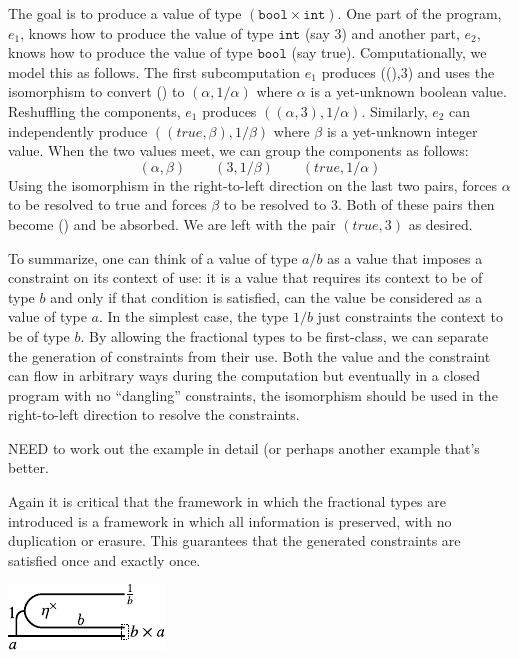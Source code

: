 \documentclass[preprint]{sigplanconf}
\begin{document}
{The goal is to produce a value of type $(\texttt{bool} \times
\texttt{int})$. One part of the program, $e_1$, knows how to produce the
value of type $\texttt{int}$ (say {{3}}) and another part, $e_2$, knows how
to produce the value of type $\texttt{bool}$ (say true). Computationally, we
model this as follows. The first subcomputation $e_1$ produces {{((),3)}} and
uses the isomorphism to convert {{()}} to $(\alpha,1/\alpha)$ where $\alpha$
is a yet-unknown boolean value. Reshuffling the components, $e_1$ produces
$((\alpha,3), 1/\alpha)$. Similarly, $e_2$ can independently produce
$((true,\beta),1/\beta)$ where $\beta$ is a yet-unknown integer value.  When
the two values meet, we can group the components as follows:
\[
(\alpha,\beta)  \qquad (3,1/\beta)  \qquad (true,1/\alpha)
\]
Using the isomorphism in the right-to-left direction on the last two pairs,
forces $\alpha$ to be resolved to true and forces $\beta$ to be resolved to
{{3}}. Both of these pairs then become {{()}} and be absorbed. We are left
with the pair $(true,3)$ as desired.

To summarize, one can think of a value of type $a/b$ as a value that imposes
a constraint on its context of use: it is a value that requires its context
to be of type $b$ and only if that condition is satisfied, can the value be
considered as a value of type $a$. In the simplest case, the type $1/b$ just
constraints the context to be of type $b$. By allowing the fractional types
to be first-class, we can separate the generation of constraints from their
use. Both the value and the constraint can flow in arbitrary ways during the
computation but eventually in a closed program with no ``dangling''
constraints, the isomorphism should be used in the right-to-left direction to
resolve the constraints.

NEED to work out the example in detail (or perhaps another example that's
better. 

Again it is critical that the framework in which the fractional types are
introduced is a framework in which all information is preserved, with no
duplication or erasure. This guarantees that the generated constraints are
satisfied once and exactly once. 

\begin{center}
  \includegraphics{diagrams/algebra2.pdf}
\end{center}

}
\end{document}
